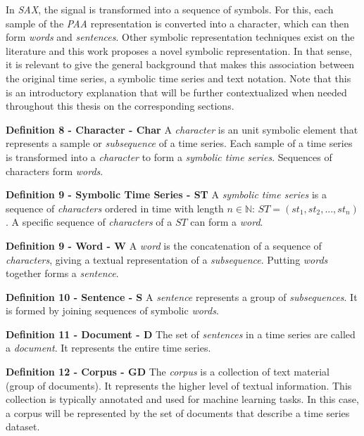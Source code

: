 In \textit{SAX}, the signal is transformed into a sequence of symbols. For this, each sample of the \textit{PAA} representation is converted into a character, which can then form \textit{words} and \textit{sentences}. Other symbolic representation techniques exist on the literature and this work proposes a novel symbolic representation. In that sense, it is relevant to give the general background that makes this association between the original time series, a symbolic time series and text notation. Note that this is an introductory explanation that will be further contextualized when needed throughout this thesis on the corresponding sections.

\item \textbf{Definition 8 - Character - Char} A \textit{character} is an unit symbolic element that represents a sample or \textit{subsequence} of a time series. Each sample of a time series is transformed into a \textit{character} to form a \textit{symbolic time series}. Sequences of characters form \textit{words}.

\item \textbf{Definition 9 - Symbolic Time Series - ST} A \textit{symbolic time series} is a sequence of \textit{characters} ordered in time with length $n \in \mathbb{N}$: $ST = (st_1, st_2, ..., st_n)$. A specific sequence of \textit{characters} of a $ST$ can form a \textit{word}.

\item \textbf{Definition 9 - Word - W} A \textit{word} is the concatenation of a sequence of \textit{characters}, giving a textual representation of a \textit{subsequence}. Putting \textit{words} together forms a \textit{sentence}.


\item \textbf{Definition 10 - Sentence - S} A \textit{sentence} represents a group of \textit{subsequences}. It is formed by joining sequences of symbolic \textit{words}.

\item \textbf{Definition 11 - Document - D} The set of \textit{sentences} in a time series are called a \textit{document}. It represents the entire time series.

\item \textbf{Definition 12 - Corpus - GD} The \textit{corpus} is a collection of text material (group of documents). It represents the higher level of textual information. This collection is typically annotated and used for machine learning tasks. In this case, a corpus will be represented by the set of documents that describe a time series dataset.

